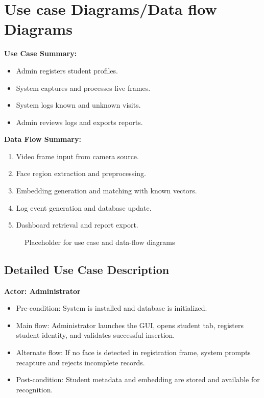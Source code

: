\documentclass{fisatprojectfinal}
\begin{document}
\section{Use case Diagrams/Data flow Diagrams}
\textbf{Use Case Summary:}
\begin{itemize}
	\item Admin registers student profiles.
	\item System captures and processes live frames.
	\item System logs known and unknown visits.
	\item Admin reviews logs and exports reports.
\end{itemize}

\textbf{Data Flow Summary:}
\begin{enumerate}
	\item Video frame input from camera source.
	\item Face region extraction and preprocessing.
	\item Embedding generation and matching with known vectors.
	\item Log event generation and database update.
	\item Dashboard retrieval and report export.
\end{enumerate}

\begin{figure}[h!]
	\begin{center}
		\fbox{\rule{0pt}{2in}\rule{0.8\linewidth}{0pt}}
		\caption{Placeholder for use case and data-flow diagrams}
	\end{center}
\end{figure}

\subsection*{Detailed Use Case Description}
\textbf{Actor: Administrator}
\begin{itemize}
	\item Pre-condition: System is installed and database is initialized.
	\item Main flow: Administrator launches the GUI, opens student tab, registers student identity, and validates successful insertion.
	\item Alternate flow: If no face is detected in registration frame, system prompts recapture and rejects incomplete records.
	\item Post-condition: Student metadata and embedding are stored and available for recognition.
\end{itemize}
\end{document}

